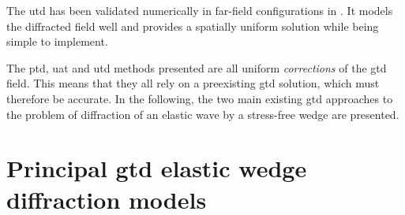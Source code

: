 The \acrfull{utd} has been validated numerically in far-field configurations in \cite{AKDthese}. It models the diffracted field well and provides a spatially uniform solution while being simple to implement.

The \acrshort{ptd}, \acrshort{uat} and \acrshort{utd} methods presented are all uniform \textit{corrections} of the \acrshort{gtd} field. This means that they all rely on a preexisting \acrshort{gtd} solution, which must therefore be accurate. In the following, the two main existing \acrshort{gtd} approaches to the problem of diffraction of an elastic wave by a stress-free wedge are presented.

\section{Principal \acrshort{gtd} elastic wedge diffraction models}

